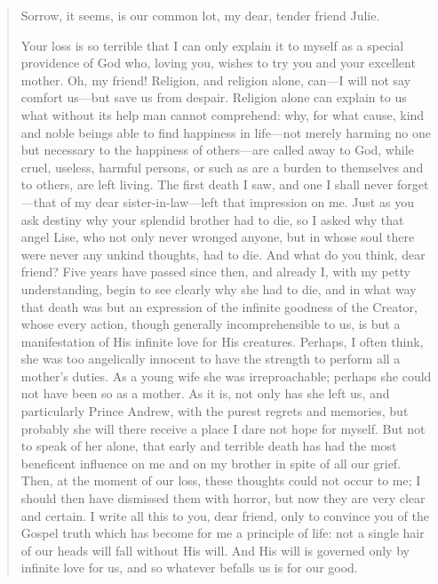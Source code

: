 \begin{quote} \calli

Sorrow, it seems, is our common lot, my dear, tender friend
Julie.

Your loss is so terrible that I can only explain it to myself as
a special providence of God who, loving you, wishes to try you
and your excellent mother. Oh, my friend! Religion, and religion
alone, can---I will not say comfort us---but save us from
despair. Religion alone can explain to us what without its help
man cannot comprehend: why, for what cause, kind and noble beings
able to find happiness in life---not merely harming no one but
necessary to the happiness of others---are called away to God,
while cruel, useless, harmful persons, or such as are a burden to
themselves and to others, are left living. The first death I saw,
and one I shall never forget---that of my dear
sister-in-law---left that impression on me. Just as you ask
destiny why your splendid brother had to die, so I asked why that
angel Lise, who not only never wronged anyone, but in whose soul
there were never any unkind thoughts, had to die. And what do you
think, dear friend? Five years have passed since then, and
already I, with my petty understanding, begin to see clearly why
she had to die, and in what way that death was but an expression
of the infinite goodness of the Creator, whose every action,
though generally incomprehensible to us, is but a manifestation
of His infinite love for His creatures. Perhaps, I often think,
she was too angelically innocent to have the strength to perform
all a mother's duties. As a young wife she was irreproachable;
perhaps she could not have been so as a mother. As it is, not
only has she left us, and particularly Prince Andrew, with the
purest regrets and memories, but probably she will there receive
a place I dare not hope for myself. But not to speak of her
alone, that early and terrible death has had the most beneficent
influence on me and on my brother in spite of all our
grief. Then, at the moment of our loss, these thoughts could not
occur to me; I should then have dismissed them with horror, but
now they are very clear and certain. I write all this to you,
dear friend, only to convince you of the Gospel truth which has
become for me a principle of life: not a single hair of our heads
will fall without His will. And His will is governed only by
infinite love for us, and so whatever befalls us is for our good.


\end{quote}
